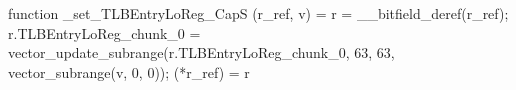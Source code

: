 function _set_TLBEntryLoReg_CapS (r_ref, v) = {
    r = __bitfield_deref(r_ref);
    r.TLBEntryLoReg_chunk_0 = vector_update_subrange(r.TLBEntryLoReg_chunk_0, 63, 63, vector_subrange(v, 0, 0));
    (*r_ref) = r
}
